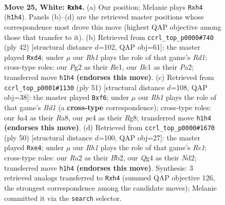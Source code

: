 \documentclass[11pt]{article}
\begin{document}
\clearpage

\begin{figure}[p]\centering
\begin{subfigure}{0.46\textwidth}\centering
\resizebox{\linewidth}{!}{%
\newchessgame
\chessboard[
  setfen={r3k1nr/b7/4p3/pp2q3/b1p3Qp/P7/RP1NNPP1/2B1K2R w kq - 0 25},
  showmover=false,
  pgfstyle=straightmove, color=movearrow, markmove={h1-h4}
]}
\caption{}
\end{subfigure}\hfill
\begin{subfigure}{0.46\textwidth}\centering
\resizebox{\linewidth}{!}{%
\newchessgame
\chessboard[
  setfen={r1b3k1/ppq1rpp1/5n1p/4N3/2Pp1P2/5B1P/PQ4P1/3RR1K1 w - - 2 22},
  showmover=false,
  pgfstyle=straightmove, color=movearrow, markmove={d1-d4}
]}
\caption{}
\end{subfigure}
\\[4pt]
\begin{subfigure}{0.46\textwidth}\centering
\resizebox{\linewidth}{!}{%
\newchessgame
\chessboard[
  setfen={r2bn1rk/1p3p1p/4qP2/p2np3/P1B1N2Q/1P5P/3R2P1/5R1K b - - 2 26},
  showmover=false,
  pgfstyle=straightmove, color=movearrow, markmove={d8-f6}
]}
\caption{}
\end{subfigure}\hfill
\begin{subfigure}{0.46\textwidth}\centering
\resizebox{\linewidth}{!}{%
\newchessgame
\chessboard[
  setfen={4rbk1/1b1n2p1/3p3p/1p1P4/q3p3/PN1Q3P/1B1N1PP1/4R1K1 w - - 0 26},
  showmover=false,
  pgfstyle=straightmove, color=movearrow, markmove={e1-e4}
]}
\caption{}
\end{subfigure}
\caption{\textbf{Move 25, White: \texttt{Rxh4}.} (a) Our position; Melanie plays \texttt{Rxh4} (\texttt{h1h4}). Panels (b)--(d) are the retrieved master positions whose correspondence most drove this move (highest QAP objective among those that transfer to it). (b) Retrieved from \texttt{ccrl\_top\_p0000\#740} (ply 42) [structural distance $d$=102, QAP obj=61]: the master played \texttt{Rxd4}; under $\mu$ our \emph{Rh1} plays the role of that game's \emph{Rd1}; cross-type roles: our \emph{P}g2 as their \emph{R}e1, our \emph{B}c1 as their \emph{P}a2; transferred move \texttt{h1h4} \textbf{(endorses this move)}. (c) Retrieved from \texttt{ccrl\_top\_p0001\#1130} (ply 51) [structural distance $d$=108, QAP obj=38]: the master played \texttt{Bxf6}; under $\mu$ our \emph{Rh1} plays the role of that game's \emph{Bd1} (a \textbf{cross-type} correspondence); cross-type roles: our \emph{b}a4 as their \emph{R}a8, our \emph{p}c4 as their \emph{R}g8; transferred move \texttt{h1h4} \textbf{(endorses this move)}. (d) Retrieved from \texttt{ccrl\_top\_p0000\#1670} (ply 50) [structural distance $d$=100, QAP obj=27]: the master played \texttt{Rxe4}; under $\mu$ our \emph{Rh1} plays the role of that game's \emph{Re1}; cross-type roles: our \emph{R}a2 as their \emph{B}b2, our \emph{Q}g4 as their \emph{N}d2; transferred move \texttt{h1h4} \textbf{(endorses this move)}. Synthesis: 3 retrieved analogs transferred to \texttt{Rxh4} (summed QAP objective 126, the strongest correspondence among the candidate moves); Melanie committed it via the \texttt{search} selector.}
\label{fig:thought-m48}
\end{figure}
\end{document}
